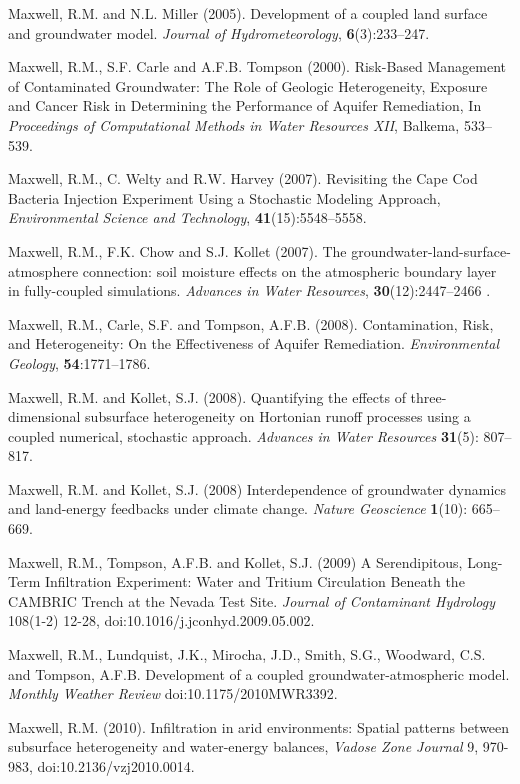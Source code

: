 \begin{thebibliography}{99}
Maxwell, R.M. and N.L. Miller (2005). Development of a coupled land surface and groundwater model.  {\em Journal of Hydrometeorology}, {\bf 6}(3):233--247.

Maxwell, R.M., S.F. Carle and A.F.B. Tompson (2000). Risk-Based Management of Contaminated Groundwater: The Role of Geologic Heterogeneity, Exposure and Cancer Risk in Determining the Performance of Aquifer Remediation, In {\em Proceedings of Computational Methods in Water Resources XII}, Balkema, 533--539.

 Maxwell, R.M., C. Welty and R.W. Harvey (2007). Revisiting the Cape Cod Bacteria Injection Experiment Using a Stochastic Modeling Approach, {\em Environmental Science and Technology}, { \bf 41}(15):5548--5558.

Maxwell, R.M., F.K. Chow and S.J. Kollet (2007). The groundwater-land-surface-atmosphere connection: soil moisture effects on the atmospheric boundary layer in fully-coupled simulations. {\em Advances in Water Resources}, {\bf 30}(12):2447--2466 .

Maxwell, R.M., Carle, S.F. and Tompson, A.F.B. (2008).
Contamination, Risk, and Heterogeneity: On the Effectiveness of Aquifer Remediation. {\em Environmental Geology}, {\bf 54}:1771--1786.

Maxwell, R.M. and Kollet, S.J. (2008). Quantifying the effects of three-dimensional subsurface heterogeneity on Hortonian runoff processes using a coupled numerical, stochastic approach. {\em Advances in Water Resources} {\bf 31}(5): 807--817. 

Maxwell, R.M. and Kollet, S.J. (2008) Interdependence of groundwater dynamics and land-energy feedbacks under climate change. {\em Nature Geoscience} {\bf 1}(10): 665--669.

Maxwell, R.M., Tompson, A.F.B. and Kollet, S.J. (2009) A Serendipitous, Long-Term Infiltration Experiment: Water and Tritium Circulation Beneath the CAMBRIC Trench at the Nevada Test Site. {\em Journal of Contaminant Hydrology} 108(1-2) 12-28, doi:10.1016/j.jconhyd.2009.05.002.

Maxwell, R.M., Lundquist, J.K., Mirocha, J.D., Smith, S.G., Woodward, C.S. and Tompson, A.F.B. Development of a coupled groundwater-atmospheric model. {\em Monthly Weather Review} doi:10.1175/2010MWR3392.

Maxwell, R.M. (2010). Infiltration in arid environments: Spatial patterns between subsurface heterogeneity and water-energy balances, {\em Vadose Zone Journal} 9, 970-983, doi:10.2136/vzj2010.0014.


\end{thebibliography}
